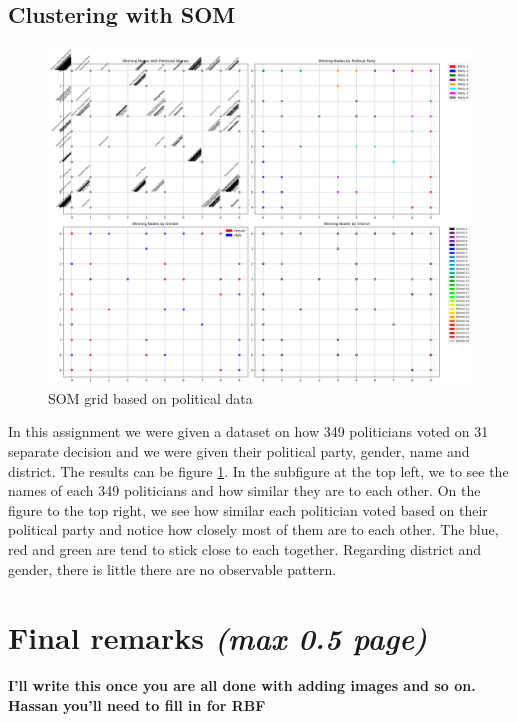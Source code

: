 \documentclass[a4paper]{article}
\begin{document}
\subsection{Clustering with SOM}
\begin{figure}[htb]
    \centering
    \includegraphics[width=\textwidth]{Labs/Lab 2/Results/politics_som.png}
    \caption{SOM grid based on political data}
    \label{fig:SOM_politics}
\end{figure}
In this assignment we were given a dataset on how 349 politicians voted on 31 separate decision and we were given their political party, gender, name and district. The results can be figure \ref{fig:SOM_politics}. In the subfigure at the top left, we to see the names of each 349 politicians and how similar they are to each other. On the figure to the top right, we see how similar each politician voted based on their political party and notice how closely most of them are to each other. The blue, red and green are tend to stick close to each together. Regarding district and gender, there is little there are no observable pattern. 




\section{Final remarks \normalsize{\textit{(max 0.5 page)}}}
\textbf{I'll write this once you are all done with adding images and so on. Hassan you'll need to fill in for RBF}
\end{document}
